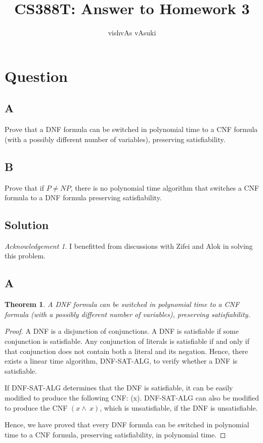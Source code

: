\documentclass[10pt]{amsart}
\title{CS388T: Answer to Homework 3}
\author{vishvAs vAsuki}
\newtheorem{thm}{Theorem}[subsection]
\theoremstyle{remark}
\newtheorem*{ack}{Acknowledgement}
\begin{document}
\maketitle

\section{Question}
\subsection{A} Prove that a DNF formula can be switched in polynomial time to a CNF formula (with a possibly different number of variables), preserving satisfiability.

\subsection{B} Prove that if $P \neq NP$, there is no polynomial time algorithm that switches a CNF formula to a DNF formula preserving satisfiability.

\subsection{Solution}

\begin{ack}
I benefitted from discussions with Zifei and Alok in solving this problem.
\end{ack}

\subsection{A} 

\begin{thm}
A DNF formula can be switched in polynomial time to a CNF formula (with a possibly different number of variables), preserving satisfiability.
\end{thm}
\begin{proof}
A DNF is a disjunction of conjunctions. A DNF is satisfiable if some conjunction is satisfiable. Any conjunction of literals is satisfiable if and only if that conjunction does not contain both a literal and its negation. Hence, there exists a linear time algorithm, DNF-SAT-ALG, to verify whether a DNF is satisfiable.

If DNF-SAT-ALG determines that the DNF is satisfiable, it can be easily modified to produce the following CNF: (x). DNF-SAT-ALG can also be modified to produce the CNF $(x \wedge ~x)$, which is unsatisfiable, if the DNF is unsatisfiable.

Hence, we have proved that every DNF formula can be switched in polynomial time to a CNF formula, preserving satisfiability, in polynomial time.
\end{proof}
\end{document}
